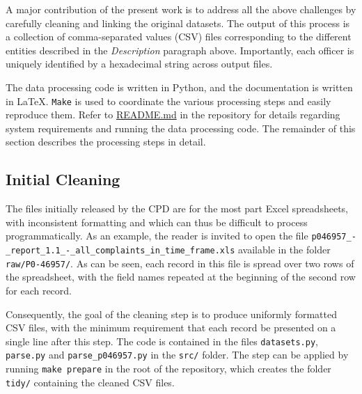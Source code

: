 A major contribution of the present work is to address all the above challenges
by carefully cleaning and linking the original datasets. The output of this
process is a collection of comma-separated values (CSV) files corresponding to
the different entities described in the \emph{Description} paragraph above.
Importantly, each officer is uniquely identified by a hexadecimal string across
output files.

The data processing code is written in Python, and the documentation is written
in \LaTeX.  \texttt{Make} is used to coordinate the various processing steps
and easily reproduce them.  Refer to \url{README.md} in the repository for
details regarding system requirements and running the data processing code. The
remainder of this section describes the processing steps in detail.

\subsection{Initial Cleaning}

The files initially released by the CPD are for
the most part Excel spreadsheets, with inconsistent formatting and which can
thus be difficult to process programmatically. As an example, the reader is
invited to open the file
\texttt{p046957\_-\_report\_1.1\_-\_all\_complaints\_in\_time\_frame.xls}
available in the folder \texttt{raw/P0-46957/}. As can be seen, each record in
this file is spread over two rows of the spreadsheet, with the field names
repeated at the beginning of the second row for each record.

Consequently, the goal of the cleaning step is to produce uniformly formatted
CSV files, with the minimum requirement that each record be presented on
a single line after this step. The code is contained in the files
\texttt{datasets.py}, \texttt{parse.py} and \texttt{parse\_p046957.py} in the
\texttt{src/} folder.  The step can be applied by running \texttt{make prepare}
in the root of the repository, which creates the folder \texttt{tidy/}
containing the cleaned CSV files.

